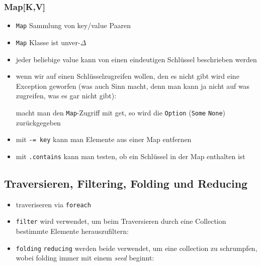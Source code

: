 \subsubsection{Map[K,V]}
\begin{itemize}
  \item \texttt{Map} Sammlung von key/value Paaren
  \item \texttt{Map} Klasse ist unver-$\Delta$
  \item jeder beliebige value kann von einen eindeutigen Schlüssel
  beschrieben werden
    
  \item wenn wir auf einen Schlüsselzugreifen wollen, den es nicht
  gibt wird eine Exception geworfen (was auch Sinn macht, denn man
  kann ja nicht auf was zugreifen, was es gar nicht gibt):
 
  

  macht man den \texttt{Map}-Zugriff mit get, so wird die 
  \texttt{Option} (\texttt{Some} \oder \texttt{None}) zurückgegeben
  \item mit \texttt{-= key} kann man Elemente aus einer Map
  entfernen
  \item mit \texttt{.contains} kann man testen, ob ein Schlüssel in
  der Map enthalten ist
\end{itemize}


\subsection{Traversieren, Filtering, Folding und Reducing}
\begin{itemize}
  \item traveriseren via \texttt{foreach}
      
  \item \texttt{filter} wird verwendet, um beim Traversieren durch eine
  Collection bestimmte Elemente herauszufiltern:
  
  
  
  \item \texttt{folding} \und \texttt{reducing} werden beide verwendet, um
  eine collection zu schrumpfen, wobei folding immer mit einem 
  \textit{seed} beginnt:
  
    
\end{itemize}


